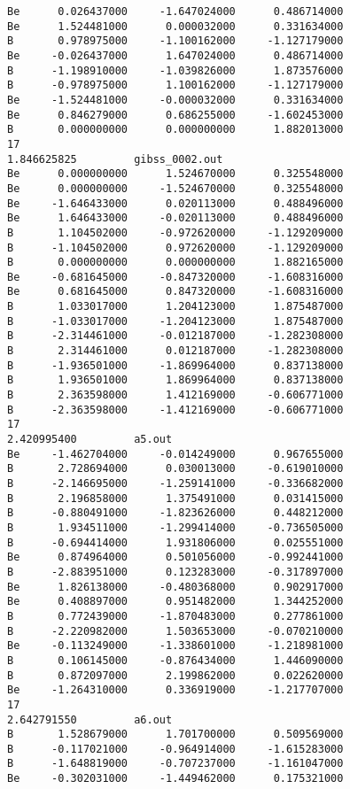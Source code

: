 \documentclass[prb,aps,preprint,showkeys,showpacs]{revtex4}
\begin{document}
\begin{verbatim}
Be      0.026437000     -1.647024000      0.486714000
Be      1.524481000      0.000032000      0.331634000
B       0.978975000     -1.100162000     -1.127179000
Be     -0.026437000      1.647024000      0.486714000
B      -1.198910000     -1.039826000      1.873576000
B      -0.978975000      1.100162000     -1.127179000
Be     -1.524481000     -0.000032000      0.331634000
Be      0.846279000      0.686255000     -1.602453000
B       0.000000000      0.000000000      1.882013000
17    
1.846625825         gibss_0002.out
Be      0.000000000      1.524670000      0.325548000
Be      0.000000000     -1.524670000      0.325548000
Be     -1.646433000      0.020113000      0.488496000
Be      1.646433000     -0.020113000      0.488496000
B       1.104502000     -0.972620000     -1.129209000
B      -1.104502000      0.972620000     -1.129209000
B       0.000000000      0.000000000      1.882165000
Be     -0.681645000     -0.847320000     -1.608316000
Be      0.681645000      0.847320000     -1.608316000
B       1.033017000      1.204123000      1.875487000
B      -1.033017000     -1.204123000      1.875487000
B      -2.314461000     -0.012187000     -1.282308000
B       2.314461000      0.012187000     -1.282308000
B      -1.936501000     -1.869964000      0.837138000
B       1.936501000      1.869964000      0.837138000
B       2.363598000      1.412169000     -0.606771000
B      -2.363598000     -1.412169000     -0.606771000
17    
2.420995400         a5.out
Be     -1.462704000     -0.014249000      0.967655000
B       2.728694000      0.030013000     -0.619010000
B      -2.146695000     -1.259141000     -0.336682000
B       2.196858000      1.375491000      0.031415000
B      -0.880491000     -1.823626000      0.448212000
B       1.934511000     -1.299414000     -0.736505000
B      -0.694414000      1.931806000      0.025551000
Be      0.874964000      0.501056000     -0.992441000
B      -2.883951000      0.123283000     -0.317897000
Be      1.826138000     -0.480368000      0.902917000
Be      0.408897000      0.951482000      1.344252000
B       0.772439000     -1.870483000      0.277861000
B      -2.220982000      1.503653000     -0.070210000
Be     -0.113249000     -1.338601000     -1.218981000
B       0.106145000     -0.876434000      1.446090000
B       0.872097000      2.199862000      0.022620000
Be     -1.264310000      0.336919000     -1.217707000
17    
2.642791550         a6.out
B       1.528679000      1.701700000      0.509569000
B      -0.117021000     -0.964914000     -1.615283000
B      -1.648819000     -0.707237000     -1.161047000
Be     -0.302031000     -1.449462000      0.175321000

\end{verbatim}
\end{document}
